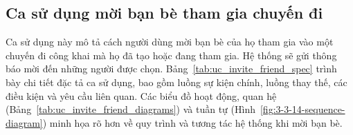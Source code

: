 \subsection{Ca sử dụng mời bạn bè tham gia chuyến đi}
\noindent Ca sử dụng này mô tả cách người dùng mời bạn bè của họ tham gia vào một chuyến đi công khai mà họ đã tạo hoặc đang tham gia. Hệ thống sẽ gửi thông báo mời đến những người được chọn. Bảng~\ref{tab:uc_invite_friend_spec} trình bày chi tiết đặc tả ca sử dụng, bao gồm luồng sự kiện chính, luồng thay thế, các điều kiện và yêu cầu liên quan. Các biểu đồ hoạt động, quan hệ (Bảng~\ref{tab:uc_invite_friend_diagrams}) và tuần tự (Hình~\ref{fig:3-3-14-sequence-diagram}) minh họa rõ hơn về quy trình và tương tác hệ thống khi mời bạn bè.

